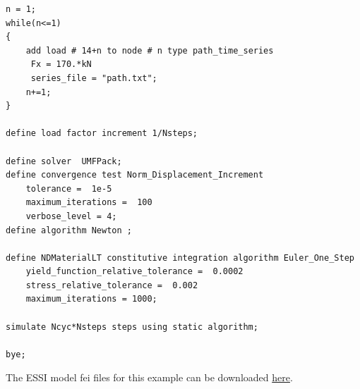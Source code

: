 \begin{lstlisting}
n = 1;
while(n<=1)
{
    add load # 14+n to node # n type path_time_series 
     Fx = 170.*kN 
     series_file = "path.txt";        
    n+=1;
}

define load factor increment 1/Nsteps;

define solver  UMFPack;
define convergence test Norm_Displacement_Increment  
    tolerance =  1e-5
    maximum_iterations =  100
    verbose_level = 4;
define algorithm Newton ;

define NDMaterialLT constitutive integration algorithm Euler_One_Step
    yield_function_relative_tolerance =  0.0002
    stress_relative_tolerance =  0.002
    maximum_iterations = 1000;

simulate Ncyc*Nsteps steps using static algorithm;

bye;    
\end{lstlisting}

The    ESSI   model   fei   files   for   this   example   can   be   downloaded
\href{https://github.com/BorisJeremic/Real-ESSI-Examples/blob/master/model_fei_file/shearbeam_pisano_plastic8NodeBrickLT_DruckerPragerArmstrongFrederick/8NodeBrickLT_DruckerPragerArmstrongFrederick.tgz?raw=true}{here}.








































